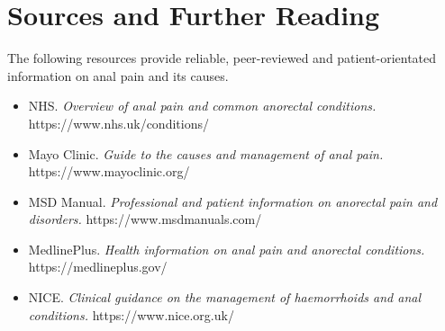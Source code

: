 \section*{Sources and Further Reading}
The following resources provide reliable, peer-reviewed and patient-orientated information on anal pain and its causes.

\begin{itemize}
    \item NHS. \textit{Overview of anal pain and common anorectal conditions.} https://www.nhs.uk/conditions/
    \item Mayo Clinic. \textit{Guide to the causes and management of anal pain.} https://www.mayoclinic.org/
    \item MSD Manual. \textit{Professional and patient information on anorectal pain and disorders.} https://www.msdmanuals.com/
    \item MedlinePlus. \textit{Health information on anal pain and anorectal conditions.} https://medlineplus.gov/
    \item NICE. \textit{Clinical guidance on the management of haemorrhoids and anal conditions.} https://www.nice.org.uk/
\end{itemize}
